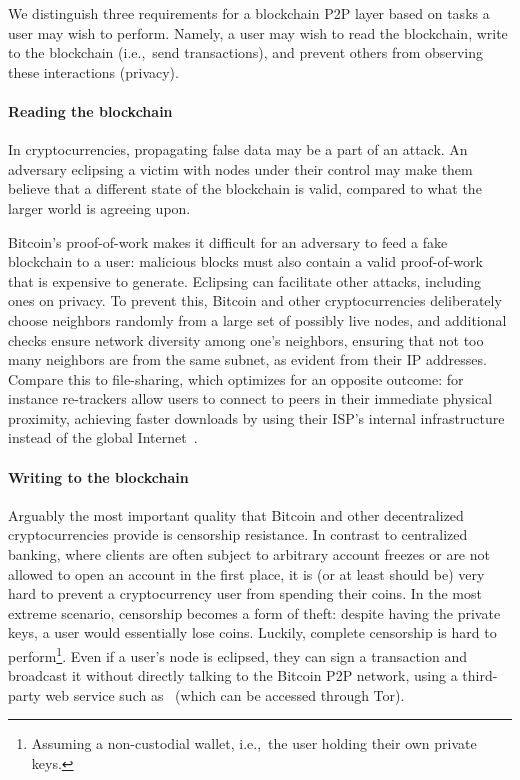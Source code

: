 We distinguish three requirements for a blockchain P2P layer based on tasks a user may wish to perform.
Namely, a user may wish to read the blockchain, write to the blockchain (i.e.,~send transactions), and prevent others from observing these interactions (privacy).

\paragraph{Reading the blockchain}
In cryptocurrencies, propagating false data may be a part of an attack.
An adversary eclipsing a victim with nodes under their control may make them believe that a different state of the blockchain is valid, compared to what the larger world is agreeing upon.

Bitcoin's proof-of-work makes it difficult for an adversary to feed a fake blockchain to a user: malicious blocks must also contain a valid proof-of-work that is expensive to generate.
Eclipsing can facilitate other attacks, including ones on privacy.
To prevent this, Bitcoin and other cryptocurrencies deliberately choose neighbors randomly from a large set of possibly live nodes, and additional checks ensure network diversity among one's neighbors, ensuring that not too many neighbors are from the same subnet, as evident from their IP addresses.
Compare this to file-sharing, which optimizes for an opposite outcome: for instance re-trackers allow users to connect to peers in their immediate physical proximity, achieving faster downloads by using their ISP's internal infrastructure instead of the global Internet~\cite{Yoshida2012,Wang2012}.

\paragraph{Writing to the blockchain}
Arguably the most important quality that Bitcoin and other decentralized cryptocurrencies provide is censorship resistance.
In contrast to centralized banking, where clients are often subject to arbitrary account freezes or are not allowed to open an account in the first place, it is (or at least should be) very hard to prevent a cryptocurrency user from spending their coins.
In the most extreme scenario, censorship becomes a form of theft: despite having the private keys, a user would essentially lose coins.
Luckily, complete censorship is hard to perform\footnote{Assuming a non-custodial wallet, i.e.,~the user holding their own private keys.}.
Even if a user's node is eclipsed, they can sign a transaction and broadcast it without directly talking to the Bitcoin P2P network, using a third-party web service such as~\cite{Blockstream} (which can be accessed through Tor).

